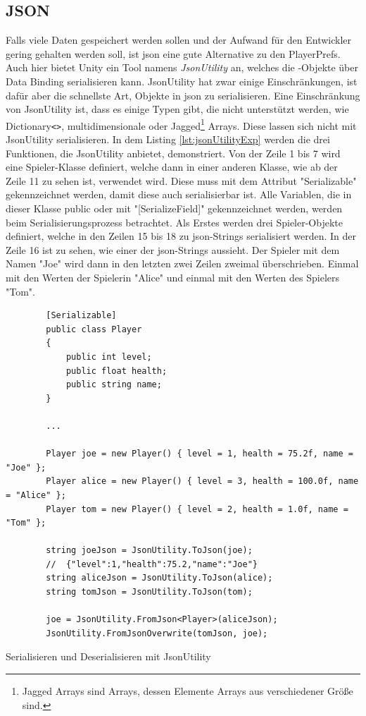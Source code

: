 \subsection{JSON}
Falls viele Daten gespeichert werden sollen und der Aufwand für den Entwickler gering gehalten werden soll, ist \ac{json} eine gute Alternative zu den PlayerPrefs. Auch hier bietet Unity ein Tool namens \textit{JsonUtility} an, welches die \csharp{}-Objekte über Data Binding serialisieren kann. JsonUtility hat zwar einige Einschränkungen, ist dafür aber die schnellste Art, Objekte in \ac{json} zu serialisieren. Eine Einschränkung von JsonUtility ist, dass es einige Typen gibt, die nicht unterstützt werden, wie Dictionary\texttt{<>}, multidimensionale oder Jagged\footnote{Jagged Arrays sind Arrays, dessen Elemente Arrays aus verschiedener Größe sind.\cite{microsoftVerzweigteArrays}} Arrays. Diese lassen sich nicht mit JsonUtility serialisieren. In dem Listing \ref{lst:jsonUtilityExp} werden die drei Funktionen, die JsonUtility anbietet, demonstriert. Von der Zeile 1 bis 7 wird eine Spieler-Klasse definiert, welche dann in einer anderen Klasse, wie ab der Zeile 11 zu sehen ist, verwendet wird. Diese muss mit dem Attribut "Serializable" gekennzeichnet werden, damit diese auch serialisierbar ist. Alle Variablen, die in dieser Klasse public oder mit "[SerializeField]" gekennzeichnet werden, werden beim Serialisierungsprozess betrachtet. Als Erstes werden drei Spieler-Objekte definiert, welche in den Zeilen 15 bis 18 zu \ac{json}-Strings serialisiert werden. In der Zeile 16 ist zu sehen, wie einer der \ac{json}-Strings aussieht. Der Spieler mit dem Namen "Joe" wird dann in den letzten zwei Zeilen zweimal überschrieben. Einmal mit den Werten der Spielerin "Alice" und einmal mit den Werten des Spielers "Tom".\cite{unityJsonUtility}\cite{unitySerializationRules} 

\begin{listing}[htp]
    \begin{verbatim} 
        [Serializable]
        public class Player
        {
            public int level;
            public float health;
            public string name;
        }

        ...
        
        Player joe = new Player() { level = 1, health = 75.2f, name = "Joe" };
        Player alice = new Player() { level = 3, health = 100.0f, name = "Alice" };
        Player tom = new Player() { level = 2, health = 1.0f, name = "Tom" };

        string joeJson = JsonUtility.ToJson(joe);
        //  {"level":1,"health":75.2,"name":"Joe"}
        string aliceJson = JsonUtility.ToJson(alice);
        string tomJson = JsonUtility.ToJson(tom);

        joe = JsonUtility.FromJson<Player>(aliceJson);
        JsonUtility.FromJsonOverwrite(tomJson, joe);
    \end{verbatim}
    \caption{Serialisieren und Deserialisieren mit JsonUtility}
    \label{lst:jsonUtilityExp}
\end{listing}

